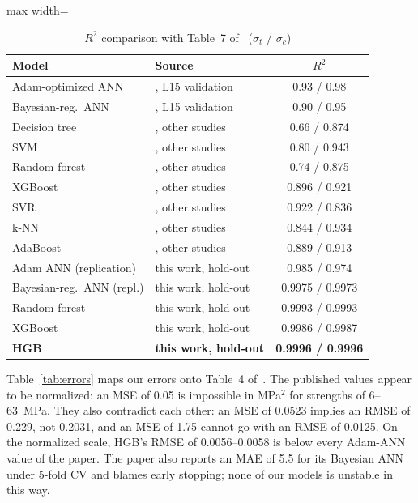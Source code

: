\documentclass[conference,12pt]{IEEEtran}
\newcommand{\st}{\ensuremath{\sigma_t}}
\newcommand{\sco}{\ensuremath{\sigma_c}}
\begin{document}
\begin{table}[!t]
\caption{$R^2$ comparison with Table~7 of~\cite{munshi2026} (\st{} / \sco{})}
\label{tab:r2}
\centering
\setlength{\tabcolsep}{4pt}
\begin{adjustbox}{max width=\columnwidth}
\begin{tabular}{@{}llc@{}}
\toprule
Model & Source & $R^2$ \\
\midrule
Adam-optimized ANN & \cite{munshi2026}, L15 validation & 0.93 / 0.98 \\
Bayesian-reg.\ ANN & \cite{munshi2026}, L15 validation & 0.90 / 0.95 \\
Decision tree & \cite{munshi2026}, other studies & 0.66 / 0.874 \\
SVM & \cite{munshi2026}, other studies & 0.80 / 0.943 \\
Random forest & \cite{munshi2026}, other studies & 0.74 / 0.875 \\
XGBoost & \cite{munshi2026}, other studies & 0.896 / 0.921 \\
SVR & \cite{munshi2026}, other studies & 0.922 / 0.836 \\
k-NN & \cite{munshi2026}, other studies & 0.844 / 0.934 \\
AdaBoost & \cite{munshi2026}, other studies & 0.889 / 0.913 \\
\midrule
Adam ANN (replication) & this work, hold-out & 0.985 / 0.974 \\
Bayesian-reg.\ ANN (repl.) & this work, hold-out & 0.9975 / 0.9973 \\
Random forest & this work, hold-out & 0.9993 / 0.9993 \\
XGBoost & this work, hold-out & 0.9986 / 0.9987 \\
\textbf{HGB} & \textbf{this work, hold-out} & \textbf{0.9996 / 0.9996} \\
\bottomrule
\end{tabular}
\end{adjustbox}
\end{table}

Table~\ref{tab:errors} maps our errors onto Table~4 of~\cite{munshi2026}. The published values appear to be normalized: an MSE of 0.05 is impossible in MPa$^2$ for strengths of 6--63~MPa. They also contradict each other: an MSE of 0.0523 implies an RMSE of 0.229, not 0.2031, and an MSE of 1.75 cannot go with an RMSE of 0.0125. On the normalized scale, HGB's RMSE of 0.0056--0.0058 is below every Adam-ANN value of the paper. The paper also reports an MAE of 5.5 for its Bayesian ANN under 5-fold CV and blames early stopping; none of our models is unstable in this way.
\end{document}
